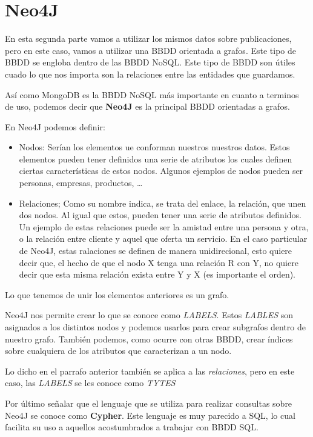 \section{Neo4J}

En esta segunda parte vamos a utilizar los mismos datos sobre publicaciones, pero en este caso, vamos a utilizar una \gls{BBDD} orientada a grafos. Este tipo de \gls{BBDD} se engloba dentro de las \gls{BBDD} NoSQL. Este tipo de \gls{BBDD} son útiles cuado lo que nos importa son la relaciones entre las entidades que guardamos. 

Así como MongoDB es la \gls{BBDD} NoSQL más importante en cuanto a terminos de uso, podemos decir que \textbf{Neo4J} es la  principal \gls{BBDD} orientadas a grafos.

En Neo4J podemos definir:

\begin{itemize}
 \item Nodos: Serían los elementos ue conforman nuestros nuestros datos. Estos elementos pueden tener definidos una serie de atributos los cuales definen ciertas características de estos nodos. Algunos ejemplos de nodos pueden ser personas, empresas, productos, \ldots
 \item Relaciones; Como su nombre indica, se trata del enlace, la relación, que unen dos nodos. Al igual que estos, pueden tener una serie de atributos definidos. Un ejemplo de estas relaciones puede ser la amistad entre una persona y otra, o la relación entre cliente y aquel que oferta un servicio. En el caso particular de Neo4J, estas ralaciones se definen de manera unidirecional, esto quiere decir que, el hecho de que el nodo X tenga una relación R con Y, no quiere decir que esta misma relación exista entre Y y X (es importante el orden). 
\end{itemize}

Lo que tenemos de unir los elementos anteriores es un grafo. 

Neo4J nos permite crear lo que se conoce como \textit{\:LABELS}. Estos \textit{\:LABLES} son asignados a los distintos nodos y podemos usarlos para crear subgrafos dentro de nuestro grafo. También podemos, como ocurre con otras \gls{BBDD}, crear índices  sobre cualquiera de los atributos que caracterizan a un nodo.

Lo dicho en el parrafo anterior también se aplica a las \textit{relaciones}, pero en este caso, las \textit{\:LABELS} se les conoce como \textit{\:TYTES}

Por último señalar que el lenguaje que se utiliza para realizar consultas sobre Neo4J se conoce como \textbf{Cypher}. Este lenguaje es muy parecido a \gls{SQL}, lo cual facilita su uso a aquellos acostumbrados a trabajar con \gls{BBDD} \gls{SQL}.



